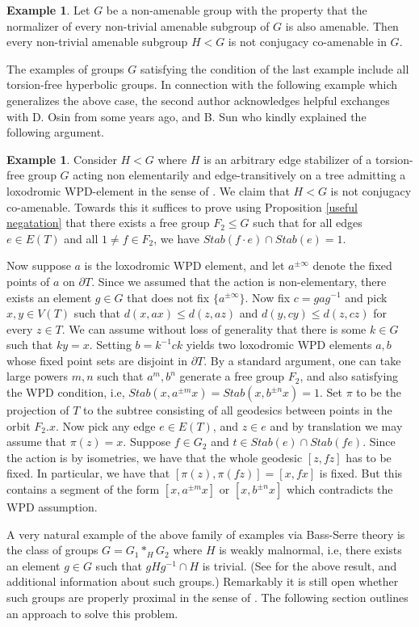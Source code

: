 \documentclass[11pt]{amsart}
\theoremstyle{definition}
\newtheorem{examp}[thm]{Example}
\begin{document}
\begin{examp}
Let $G$ be a non-amenable group with the property that the normalizer of every non-trivial amenable subgroup of $G$ is also amenable. Then every non-trivial amenable subgroup $H<G$ is not conjugacy co-amenable in $G$.
\end{examp}

The examples of groups $G$ satisfying the condition of the last example include all torsion-free hyperbolic groups. In connection with the following example which generalizes the above case, the second author acknowledges helpful exchanges with D. Osin from some years ago, and B. Sun who kindly explained the following argument.

\begin{examp}\label{aylindrical example} Consider $H<G$ where $H$ is an arbitrary edge stabilizer of a torsion-free group $G$ acting non elementarily and edge-transitively on a tree admitting a loxodromic WPD-element in the sense of \cite{Bestvina_2002}. We claim that $H<G$ is not conjugacy co-amenable. Towards this it suffices to prove using Proposition \ref{useful negatation} that there exists a free group $F_2\leq G$ such that for all edges $e\in E(T)$ and all $1\neq f\in F_2$, we have $Stab(f\cdot e)\cap Stab(e)=1$.

Now suppose $a$ is the loxodromic WPD element, and let $a^{\pm \infty}$ denote the fixed points of $a$ on $\partial T$. Since we assumed that the action is non-elementary, there exists an element $g\in G$ that does not fix $\{a^{\pm \infty}\}$. Now fix $c=gag^{-1}$ and pick $x,y\in V(T)$ such  that $d(x,ax)\leq d(z,az)$ and $d(y,cy)\leq d(z,cz)$ for every $z\in T$. We can assume without loss of generality that there is some $k\in G$ such that $ky=x$. Setting $b=k^{-1}ck$ yields two loxodromic WPD elements $a,b$ whose  fixed point sets are disjoint in $\partial T$. By a standard argument, one can take large powers $m,n$ such that $a^m, b^n$ generate a free group $F_2$, and also satisfying the WPD condition, i.e, $Stab(x, a^{\pm m}x)= Stab(x, b^{\pm n}x)=1$. Set $\pi$ to be the projection of $T$ to the subtree consisting of all geodesics between points in the orbit  $F_2.x$.
Now pick any edge $e\in E(T)$, and $z\in e$ and by translation we may assume that $\pi(z)=x$. Suppose $f\in G_2$ and $t\in Stab(e)\cap Stab(fe)$. Since the action is by isometries, we have that the whole geodesic $[z,fz]$ has to be fixed. In particular, we have that $[\pi(z), \pi(fz)]=[x,fx]$ is fixed. But this contains a segment of the form $[x,a^{\pm m}x]$ or $[x, b^{\pm n}x]$ which contradicts the WPD assumption.

A very natural example of the above family of examples via Bass-Serre theory is the class of groups $G= G_1*_H G_2$ where $H$ is weakly malnormal, i.e, there exists an element $g\in G$ such that $gHg^{-1}\cap H$ is trivial. (See \cite{MO15} for the above result, and additional information about such groups.) Remarkably it is still open whether such groups are properly proximal in the sense of \cite{BIP18}. The following section outlines an approach to solve this problem.
\end{examp}
\end{document}
